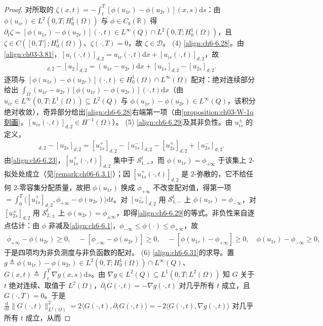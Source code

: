 \documentclass[../../main.tex]{subfiles}%
\begin{document}
\begin{proof}
对所取的 $\zeta(x,t)=-\int_t^T[\phi(u_{1r})-\phi(u_{2r})](x,s)\mathrm{d}s$：由 $\phi(u_{ir})\in L^2(0,T;H^1_0(\Omega))$ 与 $\phi\in C_b(\mathbb{R})$ 得 $\partial_t\zeta=[\phi(u_{1r})-\phi(u_{2r})](\cdot,t)\in L^\infty(Q)\cap L^2(0,T;H^1_0(\Omega))$，且 $\zeta\in C([0,T];H^1_0(\Omega))$、$\zeta(\cdot,T)=0$，故 $\zeta\in\mathscr{D}$。
(4) \eqref{align:ch6-6.28}。由\eqref{align:ch03-3.81}，$[u_i(\cdot,t)]_{d,2}=u_{ir}(\cdot,t)\mathrm{d}x+[u_{is}(\cdot,t)]_{d,2}$，故
\begin{align*}
[u_1]_{d,2}-[u_2]_{d,2}=(u_{1r}-u_{2r})\mathrm{d}x+[u_{1s}]_{d,2}-[u_{2s}]_{d,2}.
\end{align*}
逐项与 $[\phi(u_{1r})-\phi(u_{2r})](\cdot,t)\in H^1_0(\Omega)\cap L^\infty(\Omega)$ 配对：绝对连续部分给出 $\int_\Omega(u_{1r}-u_{2r})[\phi(u_{1r})-\phi(u_{2r})](\cdot,t)\mathrm{d}x$（由 $u_{ir}\in L^\infty(0,T;L^1(\Omega))\subseteq L^2(Q)$ 与 $\phi(u_{1r})-\phi(u_{2r})\in L^\infty(Q)$，该积分绝对收敛），奇异部分给出\eqref{align:ch6-6.28}右端第一项（由\cref{proposition:ch03-W-1q刻画}，$[u_{is}(\cdot,t)]_{d,2}\in H^{-1}(\Omega)$）。
(5) \eqref{align:ch6-6.29}及其非负性。由 $u^\pm_{is}$ 的定义，
\begin{align*}
[u_{1s}]_{d,2}-[u_{2s}]_{d,2}=[u^+_{1s}]_{d,2}-[u^-_{1s}]_{d,2}-[u^+_{2s}]_{d,2}+[u^-_{2s}]_{d,2}.
\end{align*}
由\eqref{align:ch6-6.23}，$[u^+_{1s}(\cdot,t)]_{d,2}$ 集中于 $\mathscr{S}^t_{1,+}$，而 $\phi(u_{1r})=\phi_{+\infty}$ 于该集上 $2$-拟处处成立（见\cref{remark:ch06-6.3.1}）；因 $[u^+_{1s}(\cdot,t)]_{d,2}$ 是 $2$-弥散的，它不给任何 $2$-零容集分配质量，故把 $\phi(u_{1r})$ 换成 $\phi_{+\infty}$ 不改变配对值，得第一项 $=\int_0^T\langle[u^+_{1s}]_{d,2},\phi_{+\infty}-\phi(u_{2r})\rangle\mathrm{d}t$。对 $[u^-_{1s}]_{d,2}$ 用 $\mathscr{S}^t_{1,-}$ 上 $\phi(u_{1r})=\phi_{-\infty}$，对 $[u^\pm_{2s}]_{d,2}$ 用 $\mathscr{S}^t_{2,\pm}$ 上 $\phi(u_{2r})=\phi_{\pm\infty}$，即得\eqref{align:ch6-6.29}的等式。非负性来自逐点估计：由 $\phi$ 非减及\eqref{align:ch6-6.1}，$\phi_{-\infty}\leqslant\phi(\cdot)\leqslant\phi_{+\infty}$，故
\begin{align*}
\phi_{+\infty}-\phi(u_{2r})\geqslant0,\quad -[\phi_{-\infty}-\phi(u_{2r})]\geqslant0,\quad
-[\phi(u_{1r})-\phi_{+\infty}]\geqslant0,\quad \phi(u_{1r})-\phi_{-\infty}\geqslant0,
\end{align*}
于是四项均为非负测度与非负函数的配对。
(6) \eqref{align:ch6-6.31}的求导。置 $g\triangleq\phi(u_{1r})-\phi(u_{2r})\in L^2(0,T;H^1_0(\Omega))\cap L^\infty(Q)$、$G(x,t)\triangleq\int_t^T\nabla g(x,s)\mathrm{d}s$。由 $\nabla g\in L^2(Q)\subseteq L^1(0,T;L^2(\Omega))$ 知 $G$ 关于 $t$ 绝对连续、取值于 $L^2(\Omega)$，$\partial_tG(\cdot,t)=-\nabla g(\cdot,t)$ 对几乎所有 $t$ 成立，且 $G(\cdot,T)=0$。于是 $\frac{\mathrm{d}}{\mathrm{d}t}\|G(\cdot,t)\|_{L^2(\Omega)}^2=2\langle G(\cdot,t),\partial_tG(\cdot,t)\rangle=-2\langle G(\cdot,t),\nabla g(\cdot,t)\rangle$ 对几乎所有 $t$ 成立，从而

\end{proof}
\end{document}
